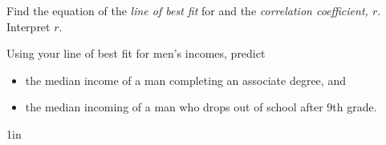 \myProblems
{
    \small 
    Find the equation of the {\itshape line of best fit} for 
    and the {\itshape correlation coefficient, $r$}. Interpret $r$.
}
{
    \small
    Using your line of best fit for men's incomes, 
    predict 
    \begin{itemize}[nosep]
        \item the median income of a man completing an associate degree, and 
        \item the median incoming of a man who drops out of school after 9th grade.
    \end{itemize}
}
{1in}


